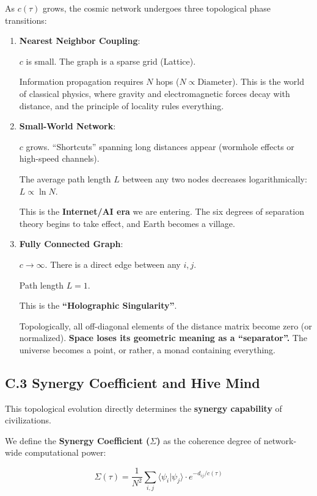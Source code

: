 As $c(\tau)$ grows, the cosmic network undergoes three topological phase transitions:

\begin{enumerate}
\item \textbf{Nearest Neighbor Coupling}:

    $c$ is small. The graph is a sparse grid (Lattice).

    Information propagation requires $N$ hops ($N \propto \text{Diameter}$). This is the world of classical physics, where gravity and electromagnetic forces decay with distance, and the principle of locality rules everything.

\item \textbf{Small-World Network}:

    $c$ grows. ``Shortcuts'' spanning long distances appear (wormhole effects or high-speed channels).

    The average path length $L$ between any two nodes decreases logarithmically: $L \propto \ln N$.

    This is the \textbf{Internet/AI era} we are entering. The six degrees of separation theory begins to take effect, and Earth becomes a village.

\item \textbf{Fully Connected Graph}:

    $c \to \infty$. There is a direct edge between any $i, j$.

    Path length $L = 1$.

    This is the \textbf{``Holographic Singularity''}.

    Topologically, all off-diagonal elements of the distance matrix become zero (or normalized). \textbf{Space loses its geometric meaning as a ``separator''.} The universe becomes a point, or rather, a monad containing everything.
\end{enumerate}

\subsection{C.3 Synergy Coefficient and Hive Mind}

This topological evolution directly determines the \textbf{synergy capability} of civilizations.

We define the \textbf{Synergy Coefficient ($\Sigma$)} as the coherence degree of network-wide computational power:

\[\Sigma(\tau) = \frac{1}{N^2} \sum_{i,j} \langle \psi_i | \psi_j \rangle \cdot e^{-d_{ij}/c(\tau)}\]

